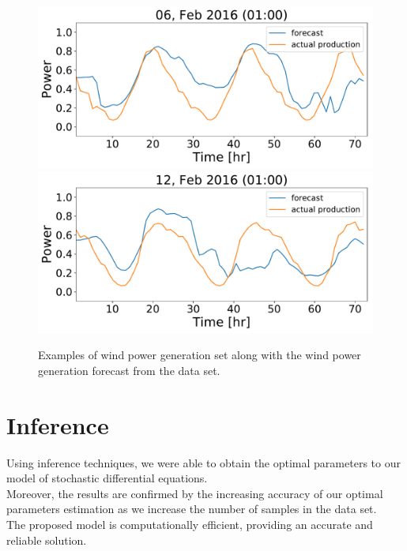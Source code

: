 \documentclass[ima, 25pt, portrait, plainboxedsections]{sciposter}
\begin{document}
\begin{multicols}{3}
\begin{figure}[t]
\begin{center}
   \includegraphics[width=1\linewidth]{Forecast_data_68.pdf}
    \includegraphics[width=1\linewidth]{Forecast_data_82.pdf}
\end{center}
   \caption{Examples of wind power generation set along with the wind power generation forecast from the data set.}
\label{fig:long}
\label{fig:onecol}
\end{figure}

\section*{Inference}
Using inference techniques, we were able to obtain the optimal parameters to our model of stochastic differential equations.\\

Moreover, the results are confirmed by the increasing accuracy of our optimal parameters estimation as we increase the number of samples in the data set.\\

The proposed model is computationally efficient, providing an accurate and reliable solution.



\end{multicols}
\end{document}
